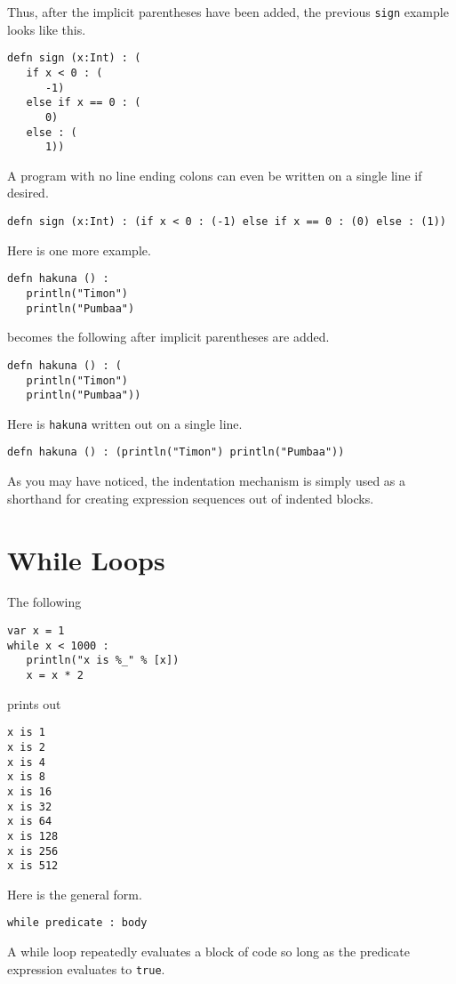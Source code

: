\documentclass[10pt,oneside]{book}
\begin{document}
Thus, after the implicit parentheses have been added, the previous \texttt{\frenchspacing sign} example looks like this.
\begin{lstlisting}
defn sign (x:Int) : (
   if x < 0 : (
      -1)
   else if x == 0 : (
      0)
   else : (
      1))
\end{lstlisting}

A program with no line ending colons can even be written on a single line if desired.
\begin{lstlisting}
defn sign (x:Int) : (if x < 0 : (-1) else if x == 0 : (0) else : (1))
\end{lstlisting}

Here is one more example.
\begin{lstlisting}
defn hakuna () :
   println("Timon")
   println("Pumbaa")
\end{lstlisting}
becomes the following after implicit parentheses are added.
\begin{lstlisting}
defn hakuna () : (
   println("Timon")
   println("Pumbaa"))
\end{lstlisting}

Here is \texttt{\frenchspacing hakuna} written out on a single line.
\begin{lstlisting}
defn hakuna () : (println("Timon") println("Pumbaa"))
\end{lstlisting}

As you may have noticed, the indentation mechanism is simply used as a shorthand for creating expression sequences out of indented blocks.

\section{While Loops}
The following
\begin{lstlisting}
var x = 1
while x < 1000 :
   println("x is %_" % [x])
   x = x * 2
\end{lstlisting}
prints out
\begin{lstlisting}
x is 1
x is 2
x is 4
x is 8
x is 16
x is 32
x is 64
x is 128
x is 256
x is 512
\end{lstlisting}

Here is the general form.
\begin{lstlisting}
while predicate : body   
\end{lstlisting}

A while loop repeatedly evaluates a block of code so long as the predicate expression evaluates to \texttt{\frenchspacing true}. 
\end{document}
